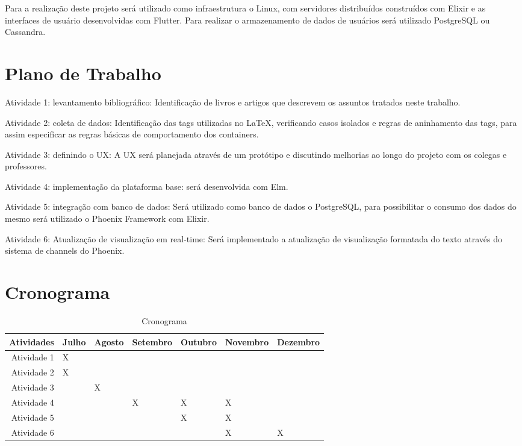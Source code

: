 \documentclass[article,12pt,oneside,a4paper,english,brazil,sumario=tradicional]{abntex2}
\begin{document}
\begin{footnotesize}
Para a realização deste projeto será utilizado como infraestrutura o Linux, com servidores distribuídos construídos 
	com Elixir e as interfaces de usuário desenvolvidas com Flutter. Para realizar o armazenamento de dados de usuários 
	será utilizado PostgreSQL ou Cassandra.





\section{Plano de Trabalho}

Atividade 1: levantamento bibliográfico: Identificação de livros e artigos que descrevem os assuntos tratados neste trabalho.

Atividade 2: coleta de dados: Identificação das tags utilizadas no LaTeX, verificando casos isolados e regras 
	de aninhamento das tags, para assim especificar as regras básicas de comportamento dos containers.

Atividade 3: definindo o UX: A UX será planejada através de um protótipo e discutindo melhorias ao longo do projeto 
	com os colegas e professores.

Atividade 4: implementação da plataforma base: será desenvolvida com Elm.

Atividade 5: integração com banco de dados: Será utilizado como banco de dados o PostgreSQL, para possibilitar 
	o consumo dos dados do mesmo será utilizado o Phoenix Framework com Elixir.

Atividade 6: Atualização de visualização em real-time: Será implementado a atualização de visualização formatada 
	do texto através do sistema de channels do Phoenix.





\section{Cronograma}

\begin{table}[h]
\centering
\caption{Cronograma}
\vspace{0.5cm}
\begin{tabular}{r|llllll}
Atividades  & Julho & Agosto & Setembro & Outubro & Novembro & Dezembro \\
\hline
Atividade 1 & X &   &   &   &   &   \\
Atividade 2 & X &   &   &   &   &   \\
Atividade 3 &   & X &   &   &   &   \\
Atividade 4 &   &   & X & X & X &   \\
Atividade 5 &   &   &   & X & X &   \\
Atividade 6 &   &   &   &   & X & X 
\end{tabular}
\end{table}


















\end{footnotesize}
\end{document}
